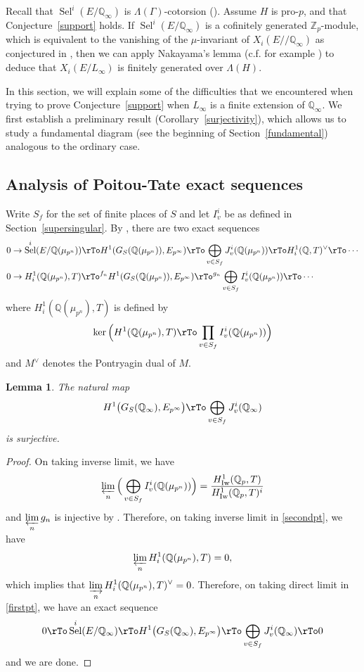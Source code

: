 \documentclass{amsart}
\newcommand{\QQ}{\mathbb Q}
\newcommand{\ZZ}{\mathbb Z}
\DeclareMathOperator{\Sel}{Sel}
\DeclareMathOperator{\Iw}{Iw}
\newcommand{\Ep}{E_{p^\infty}}
\newcommand{\Qp}{\QQ_p}
\newtheorem{lemma}[theorem]{Lemma}
\begin{document}
  Recall that $\Sel^i(E\slash \QQ_\infty)$ is $\Lambda(\Gamma)$-cotorsion (\cite[Theorem~1.2]{kobayashi03}). Assume $H$ is pro-$p$, and that Conjecture~\ref{support} holds. If $\Sel^i(E\slash\QQ_\infty)$ is a cofinitely generated $\ZZ_p$-module, which is equivalent to the vanishing of the $\mu$-invariant of $X_i(E/\slash\QQ_\infty)$ as conjectured in \cite[\S10]{kobayashi03}, then we can apply Nakayama's lemma (c.f. for example \cite[Theorem 2.6]{coateshowson01}) to deduce that $X_i(E\slash L_\infty)$ is finitely generated over $\Lambda(H)$.
  
  In this section, we will explain some of the difficulties that we encountered when trying to prove Conjecture~\ref{support} when $L_\infty$ is a finite extension of $\QQ_\infty$. We first establish a preliminary result (Corollary~\ref{surjectivity}), which allows us to study a fundamental diagram (see the beginning of Section~\ref{fundamental}) analogous to the ordinary case. 
  
   
 \subsection{Analysis of Poitou-Tate exact sequences}
  
  Write $S_f$ for the set of finite places of $S$ and let $I_v^i$ be as defined in Section~\ref{supersingular}. By \cite[\S A.3]{perrinriou95}, there are two exact sequences
  \begin{align}
   &0\rightarrow\Sel^i(E/\QQ(\mu_{p^n}))\rTo H^1(G_S(\QQ(\mu_{p^n})),\Ep)\rTo\bigoplus_{v\in S_f}J_v^i(\QQ(\mu_{p^n}))\rTo H^1_i(\QQ,T)^\vee\rTo\cdots\label{firstpt}\\
   &0\rightarrow H^1_i(\QQ(\mu_{p^n}),T)\rTo^{f_n}H^1(G_S(\QQ(\mu_{p^n})),\Ep)\rTo^{g_n}\bigoplus_{v\in S_f}I_v^i(\QQ(\mu_{p^n}))\rTo\cdots\label{secondpt}
  \end{align}
  where $H^1_i(\QQ(\mu_{p^n}),T)$ is defined by
  \[
   \ker\Big(H^1(\QQ(\mu_{p^n}),T)\rTo\prod_{v\in S_f}I^i_v(\QQ(\mu_{p^n}))\Big)
  \]
  and $M^\vee$ denotes the Pontryagin dual of $M$.
  
  \begin{lemma}
   The natural map
   \[
   H^1\big(G_S(\QQ_\infty),\Ep\big)\rTo\bigoplus_{v\in S_f} J_v^i(\QQ_\infty)
   \]
   is surjective.
  \end{lemma}
  \begin{proof}
   On taking inverse limit, we have
   \[
    \varprojlim_n\Big( \bigoplus_{v\in S_f}I_v^i(\QQ(\mu_{p^n}))\Big) = \frac{H^1_{\Iw}(\Qp,T)}{H^1_{\Iw}(\Qp,T)^i}
   \]
   and $\displaystyle\varprojlim_n g_n$ is injective by \cite[Theorem~7.3]{kobayashi03}. Therefore, on taking inverse limit in \eqref{secondpt}, we have 
   \[\varprojlim_n H^1_i(\QQ(\mu_{p^n}),T)=0,\]
   which implies that $\displaystyle\varinjlim_n H^1_i(\QQ(\mu_{p^n}),T)^\vee=0$. Therefore, on taking direct limit in \eqref{firstpt}, we have an exact sequence
   \[
    0\rTo\Sel^i(E/\QQ_\infty)\rTo H^1\big(G_S(\QQ_\infty),\Ep\big)\rTo\bigoplus_{v\in S_f} J_v^i(\QQ_\infty)\rTo 0
   \]
   and we are done.
  \end{proof}
\end{document}
